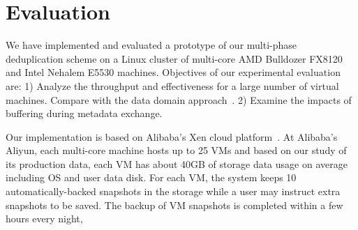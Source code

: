 
\section{Evaluation}
\label{sect:exper}

We have implemented and evaluated a prototype of our multi-phase deduplication scheme on a Linux cluster
of multi-core AMD Bulldozer FX8120 and Intel Nehalem E5530 machines.  Objectives of our experimental evaluation are:
1) Analyze the throughput and effectiveness for a large number of virtual machines.
Compare with the data domain approach~\cite{bottleneck08}.
2) Examine the impacts of buffering during metadata exchange.


Our implementation is based on Alibaba's Xen cloud platform~\cite{Aliyun,WeiZhangIEEE}.  
At Alibaba's Aliyun, each multi-core machine   hosts  up to 25 VMs and 
based on our study of its production  data,  each VM has about  40GB of storage  data usage on average
including OS and user data disk.  
For each VM, the system keeps 10 automatically-backed snapshots in the storage while
a user may instruct extra snapshots to be saved.
The backup of VM snapshots is completed within a few  hours every night,



